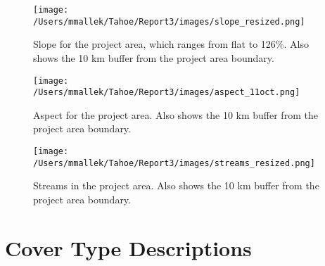 \begin{figure}[htbp]
\centering
\texttt{[image: /Users/mmallek/Tahoe/Report3/images/slope\_resized.png]}
\caption{Slope for the project area, which ranges from flat to 126\%. Also shows the 10 km buffer from the project area boundary.} 
\label{slopemap}
\end{figure}

\begin{figure}[htbp]
\centering
\texttt{[image: /Users/mmallek/Tahoe/Report3/images/aspect\_11oct.png]}
\caption{Aspect for the project area. Also shows the 10 km buffer from the project area boundary.} 
\label{aspectmap}
\end{figure}

\begin{figure}[htbp]
\centering
\texttt{[image: /Users/mmallek/Tahoe/Report3/images/streams\_resized.png]}
\caption{Streams in the project area. Also shows the 10 km buffer from the project area boundary.} 
\label{streamsmap}
\end{figure}

\chapter{Cover Type Descriptions}
\label{app:covertypedesc}

%
%
%
%
%
%
%
%
%
%
%
%
%

